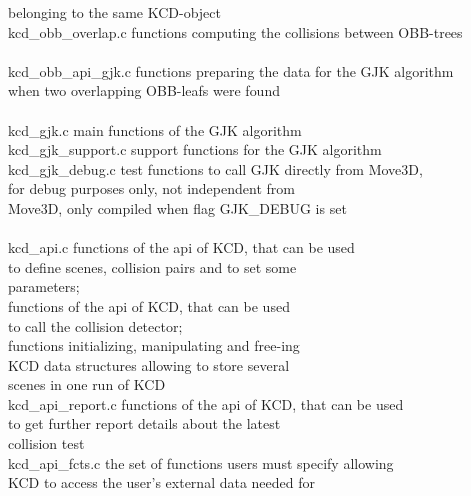 \begin{tabbing}
\>\>                          belonging to the same KCD-object\\
\> kcd\_obb\_overlap.c   \>       functions computing the collisions between OBB-trees\\
\> \> \\
\> kcd\_obb\_api\_gjk.c     \>     functions preparing the data for the GJK algorithm\\
\>\>                          when two overlapping OBB-leafs were found\\
\> \> \\
\> kcd\_gjk.c             \>     main functions of the GJK algorithm\\
\> kcd\_gjk\_support.c    \>      support functions for the GJK algorithm\\
\> kcd\_gjk\_debug.c      \>      test functions to call GJK directly from Move3D,\\
\>\>                          for debug purposes only, not independent from\\
\>\>                          Move3D, only compiled when flag GJK\_DEBUG is set\\
\> \> \\
\> kcd\_api.c          \>        functions of the api of KCD, that can be used\\
\>\>                          to define scenes, collision pairs and to set some\\
\>\>                          parameters;\\
\>\>                          functions of the api of KCD, that can be used\\
\>\>                         to call the collision detector;\\
\>\>                          functions initializing, manipulating and free-ing\\
\>\>                          KCD data structures allowing to store several \\
\>\>                          scenes in one run of KCD\\
\> kcd\_api\_report.c    \>       functions of the api of KCD, that can be used\\
\>\>                          to get further report details about the latest\\
\>\>                          collision test\\
\> kcd\_api\_fcts.c      \>       the set of functions users must specify allowing\\
\>\>                          KCD to access the user's external data needed for\\

\end{tabbing}
